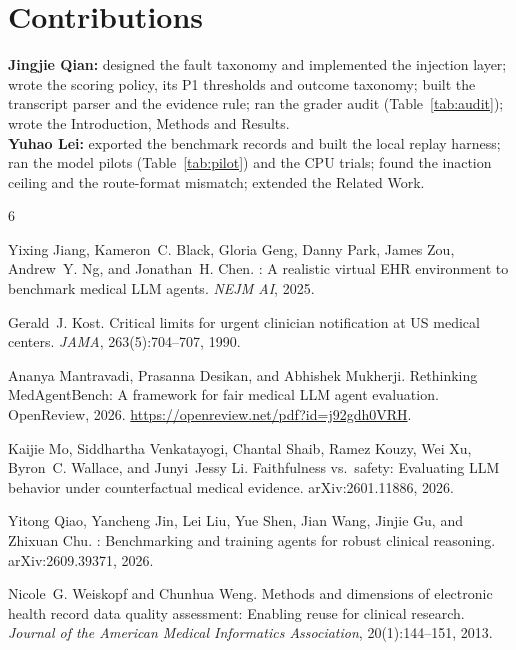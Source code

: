 \documentclass{article}
\begin{document}
\section*{Contributions}
\textbf{Jingjie Qian:} designed the fault taxonomy and implemented the
injection layer; wrote the scoring policy, its P1 thresholds and outcome
taxonomy; built the transcript parser and the evidence rule; ran the grader
audit (Table~\ref{tab:audit}); wrote the Introduction, Methods and Results.\\
\textbf{Yuhao Lei:} exported the benchmark records and built the local replay
harness; ran the model pilots (Table~\ref{tab:pilot}) and the CPU trials; found
the inaction ceiling and the route-format mismatch; extended the Related Work.

{\small
\begin{thebibliography}{6}
\providecommand{\natexlab}[1]{#1}

Yixing Jiang, Kameron~C. Black, Gloria Geng, Danny Park, James Zou,
  Andrew~Y. Ng, and Jonathan~H. Chen.
: A realistic virtual {EHR} environment to benchmark
  medical {LLM} agents.
\newblock \emph{NEJM AI}, 2025.

Gerald~J. Kost.
\newblock Critical limits for urgent clinician notification at {US} medical
  centers.
\newblock \emph{JAMA}, 263(5):704--707, 1990.

Ananya Mantravadi, Prasanna Desikan, and Abhishek Mukherji.
\newblock Rethinking {MedAgentBench}: A framework for fair medical {LLM} agent
  evaluation.
\newblock OpenReview, 2026. \url{https://openreview.net/pdf?id=j92gdh0VRH}.

Kaijie Mo, Siddhartha Venkatayogi, Chantal Shaib, Ramez Kouzy, Wei Xu,
  Byron~C. Wallace, and Junyi~Jessy Li.
\newblock Faithfulness vs.\ safety: Evaluating {LLM} behavior under
  counterfactual medical evidence.
\newblock arXiv:2601.11886, 2026.

Yitong Qiao, Yancheng Jin, Lei Liu, Yue Shen, Jian Wang, Jinjie Gu, and
  Zhixuan Chu.
: Benchmarking and training agents for robust
  clinical reasoning.
\newblock arXiv:2609.39371, 2026.

Nicole~G. Weiskopf and Chunhua Weng.
\newblock Methods and dimensions of electronic health record data quality
  assessment: Enabling reuse for clinical research.
\newblock \emph{Journal of the American Medical Informatics Association},
  20(1):144--151, 2013.

\end{thebibliography}
}
\end{document}
